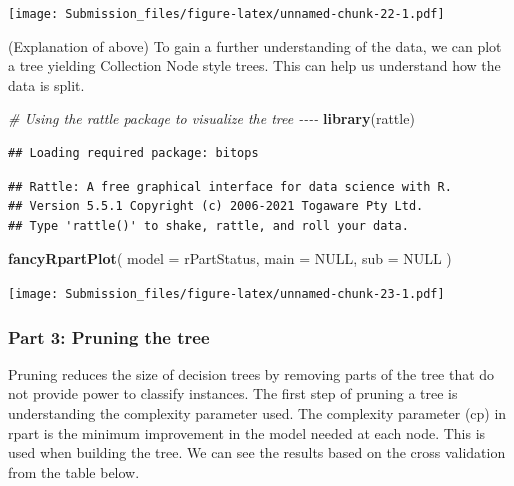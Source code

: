 \documentclass[
]{article}
\newenvironment{Shaded}{\begin{snugshade}}{\end{snugshade}}
\newcommand{\AttributeTok}[1]{\textcolor[rgb]{0.13,0.29,0.53}{#1}}
\newcommand{\CommentTok}[1]{\textcolor[rgb]{0.56,0.35,0.01}{\textit{#1}}}
\newcommand{\ConstantTok}[1]{\textcolor[rgb]{0.56,0.35,0.01}{#1}}
\newcommand{\FunctionTok}[1]{\textcolor[rgb]{0.13,0.29,0.53}{\textbf{#1}}}
\newcommand{\NormalTok}[1]{#1}
\begin{document}
\texttt{[image: Submission\_files/figure-latex/unnamed-chunk-22-1.pdf]}

(Explanation of above) To gain a further understanding of the data, we
can plot a tree yielding Collection Node style trees. This can help us
understand how the data is split.

\begin{Shaded}
\begin{Highlighting}[]
\CommentTok{\# Using the rattle package to visualize the tree {-}{-}{-}{-}}
\FunctionTok{library}\NormalTok{(rattle)}
\end{Highlighting}
\end{Shaded}

\begin{verbatim}
## Loading required package: bitops
\end{verbatim}

\begin{verbatim}
## Rattle: A free graphical interface for data science with R.
## Version 5.5.1 Copyright (c) 2006-2021 Togaware Pty Ltd.
## Type 'rattle()' to shake, rattle, and roll your data.
\end{verbatim}

\begin{Shaded}
\begin{Highlighting}[]
\FunctionTok{fancyRpartPlot}\NormalTok{(}
  \AttributeTok{model =}\NormalTok{ rPartStatus,}
  \AttributeTok{main =} \ConstantTok{NULL}\NormalTok{,}
  \AttributeTok{sub =} \ConstantTok{NULL}
\NormalTok{)}
\end{Highlighting}
\end{Shaded}

\texttt{[image: Submission\_files/figure-latex/unnamed-chunk-23-1.pdf]}

\hypertarget{part-3-pruning-the-tree}{%
\subsubsection{Part 3: Pruning the tree}\label{part-3-pruning-the-tree}}

Pruning reduces the size of decision trees by removing parts of the tree
that do not provide power to classify instances. The first step of
pruning a tree is understanding the complexity parameter used. The
complexity parameter (cp) in rpart is the minimum improvement in the
model needed at each node. This is used when building the tree. We can
see the results based on the cross validation from the table below.
\end{document}
